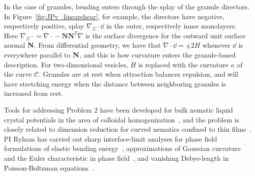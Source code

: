 In the case of granules, bending enters through the
splay of the granule directors. In
Figure~\ref{fig:JPv_linearshear}, for example, the directors have
negative, respectively positive, splay $\nabla_{\Sigma} \cdot \dd$ in
the outer, respectively inner monolayers. Here $\nabla_{\Sigma}\cdot{} =
\nabla \cdot {} - \mathbf{N}\mathbf{N}^T \nabla$ is the surface
divergence for the outward unit surface normal $\mathbf{N}$. From differential
geometry, we have that $\nabla\cdot \dd = \pm 2H$ whenever $\dd$ is
everywhere parallel to $\mathbf{N}$, and this is how curvature enters
the granule-based description.  For two-dimensional vesicles,
$H$ is replaced with the curvature $\kappa$ of the curve $\mathcal{C}$.
Granules are at rest when attraction balances repulsion, and will have
stretching energy when the distance between neighboring granules is increased
from rest.

Tools for addressing Problem 2 have been developed for bulk nematic liquid
crystal potentials in the area of colloidal
homogenization~\cite{Canevari2019DesignOE, doi:10.1137/18M1163919,
  doi:10.1137/18M1163919, BERLYAND200597, doi:10.1137/130910348}, and
the problem is closely related to dimension reduction for curved nematics
confined to thin films~\cite{Golovaty2017DimensionRF, Golovaty2015DimensionRF,
  doi:10.1142/S0218202516500470, FoFrLe07}.
PI Ryham has carried out sharp interface-limit analyses for phase field
formulations of elastic bending energy~\cite{0951-7715-18-3-016, Du05},
approximations of Gaussian curvature and the Euler characteristic in
phase field~\cite{DuEuler}, and vanishing Debye-length in 
Poisson-Boltzman equations~\cite{Lee2018, 1531-3492_2006_2_357}.

